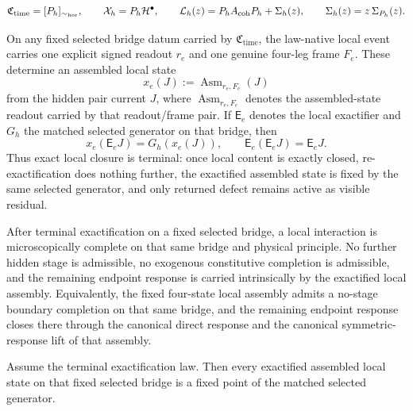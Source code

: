 \begin{tcolorbox}[colback=white, colframe=black!75, boxrule=0.9pt, title={Compact form on a representative cut}]
\[
\mathfrak C_{\mathrm{time}}=[P_h]_{\sim_{\mathrm{hor}}},
\qquad
\mathcal X_h=P_h\mathcal{H}^\bullet,
\qquad
\mathcal L_h(z)=P_hA_{\mathrm{coh}}P_h+\Sigma_h(z),
\qquad
\Sigma_h(z)=z\,\Sigma_{P_h}(z).
\]
\end{tcolorbox}

\begin{law}
\label{law:terminal-exactification}
On any fixed selected bridge datum carried by \(\mathfrak C_{\mathrm{time}}\),
the law-native local event carries one explicit signed readout \(r_e\) and one
genuine four-leg frame \(F_e\). These determine an assembled local state
\[
x_e(J):=\operatorname{Asm}_{r_e,F_e}(J)
\]
from the hidden pair current \(J\), where \(\operatorname{Asm}_{r_e,F_e}\)
denotes the assembled-state readout carried by that readout/frame pair. If
\(\mathsf E_e\) denotes the local exactifier and \(G_h\) the matched selected
generator on that bridge, then
\[
x_e(\mathsf E_e J)=G_h(x_e(J)),
\qquad
\mathsf E_e(\mathsf E_e J)=\mathsf E_e J.
\]
Thus exact local closure is terminal: once local content is exactly closed,
re-exactification does nothing further, the exactified assembled state is
fixed by the same selected generator, and only returned defect remains active
as visible residual.
\end{law}

\begin{law}
\label{law:endpoint-completion}
After terminal exactification on a fixed selected bridge, a local interaction
is microscopically complete on that same bridge and physical principle. No
further hidden stage is admissible, no exogenous constitutive completion is
admissible, and the remaining endpoint response is carried intrinsically by
the exactified local assembly. Equivalently, the fixed four-state local
assembly admits a no-stage boundary completion on that same bridge, and the
remaining endpoint response closes there through the canonical direct response
and the canonical symmetric-response lift of that assembly.
\end{law}

\begin{theorem}
\label{thm:exactified-local-states-are-generator-fixed}
Assume the terminal exactification law. Then every exactified assembled local
state on that fixed selected bridge is a fixed point of the matched selected
generator.
\end{theorem}

